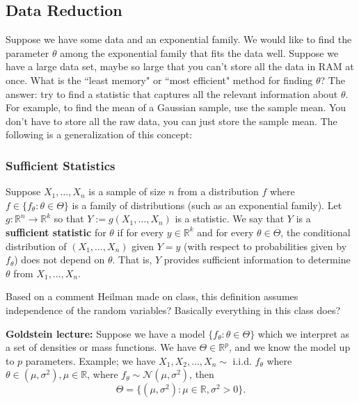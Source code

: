 \subsection{Data Reduction}

Suppose we have some data and an exponential family. We would like to find the parameter \(\theta\) among the exponential family that fits the data well. Suppose we have a large data set, maybe so large that you can't store all the data in RAM at once. What is the ``least memory" or ``most efficient" method for finding \(\theta\)? The answer: try to find a statistic that captures all the relevant information about \(\theta\). For example, to find the mean of a Gaussian sample, use the sample mean. You don't have to store all the raw data, you can just store the sample mean. The following is a generalization of this concept:

\subsubsection{Sufficient Statistics}

\begin{definition} Suppose \(X_1, \ldots, X_n\) is a sample of size \(n\) from a distribution \(f\) where \(f \in \{f_\theta: \theta \in \Theta \}\) is a family of distributions (such as an exponential family). Let \(g: \mathbb{R}^n \to \mathbb{R}^k\) so that \(Y:= g(X_1, \ldots, X_n) \) is a statistic. We say that \(Y\) is a \textbf{sufficient statistic} for \(\theta\) if for every \(y \in \mathbb{R}^k\) and for every \(\theta \in \Theta\), the conditional distribution of \((X_1, \ldots, X_n)\) given \(Y=y\) (with respect to probabilities given by \(f_\theta\)) does not depend on \(\theta\). That is, \(Y\) provides sufficient information to determine \(\theta\) from \(X_1, \ldots, X_n\).

\end{definition}

\begin{remark} Based on a comment Heilman made on class, this definition assumes independence of the random variables? Basically everything in this class does?

\end{remark}

\textbf{Goldstein lecture:} Suppose we have a model \(\{f_\theta: \theta \in \Theta\}\) which we interpret as a set of densities or mass functions. We have \(\Theta \in \mathbb{R}^p\), and we know the model up to \(p\) parameters. Example; we have \(X_1, X_2, \ldots, X_n \sim \) i.i.d. \(f_\theta\) where \(\theta \in (\mu, \sigma^2), \mu \in \mathbb{R}\), where \(f_\theta \sim \mathcal{N}(\mu, \sigma^2)\), 
then
\[
\Theta = \{ (\mu, \sigma^2): \mu \in \mathbb{R}, \sigma^2 > 0\}.
\]

